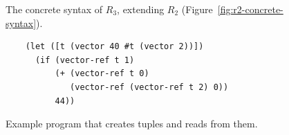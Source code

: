 \documentclass[11pt]{book}
\newcommand{\gray}[1]{{\color{gray} #1}}
\begin{document}
\begin{figure}[tbp]
\centering
\fbox{
\begin{minipage}{0.96\textwidth}
\[
\begin{array}{lcl}
  \Type &::=& \gray{\key{Integer} \mid \key{Boolean}}
  \mid (\key{Vector}\;\Type^{+}) \mid \key{Void}\\
  \itm{cmp} &::= & \gray{ \key{eq?} \mid \key{<} \mid \key{<=} \mid \key{>} \mid \key{>=} } \\
  \Exp &::=& \gray{  \Int \mid (\key{read}) \mid (\key{-}\;\Exp) \mid (\key{+} \; \Exp\;\Exp) \mid (\key{-}\;\Exp\;\Exp) }  \\
  &\mid&  \gray{  \Var \mid (\key{let}~([\Var~\Exp])~\Exp)  }\\
  &\mid& \gray{ \key{\#t} \mid \key{\#f} 
   \mid (\key{and}\;\Exp\;\Exp) 
   \mid (\key{or}\;\Exp\;\Exp)
   \mid (\key{not}\;\Exp) } \\
  &\mid& \gray{  (\itm{cmp}\;\Exp\;\Exp) 
   \mid (\key{if}~\Exp~\Exp~\Exp)  } \\
  &\mid& (\key{vector}\;\Exp^{+}) 
   \mid (\key{vector-ref}\;\Exp\;\Int) \\
  &\mid& (\key{vector-set!}\;\Exp\;\Int\;\Exp)\\
  &\mid& (\key{void}) \\
  R_3 &::=& \Exp
\end{array}
\]
\end{minipage}
}
\caption{The concrete syntax of $R_3$, extending $R_2$
  (Figure~\ref{fig:r2-concrete-syntax}).}
\label{fig:r3-concrete-syntax}
\end{figure}

\begin{figure}[tbp]
\begin{lstlisting}
    (let ([t (vector 40 #t (vector 2))])
      (if (vector-ref t 1)
          (+ (vector-ref t 0)
             (vector-ref (vector-ref t 2) 0))
          44))
\end{lstlisting}
\caption{Example program that creates tuples and reads from them.}
\label{fig:vector-eg}
\end{figure}
\end{document}
